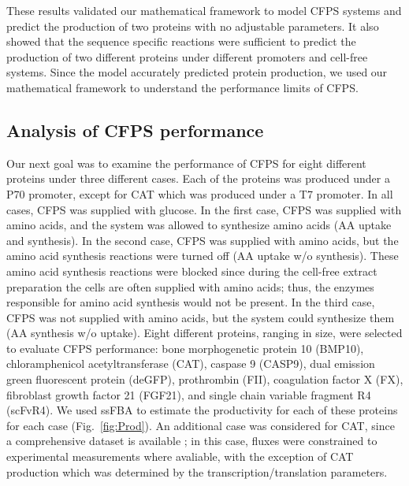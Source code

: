 \documentclass[journal=asbcd6,manuscript=article]{achemso}
\begin{document}
These results validated our mathematical framework to model CFPS systems and predict the production of two proteins with no adjustable parameters.
It also showed that the sequence specific reactions were sufficient to predict the production of two different proteins under different promoters and cell-free systems.
Since the model accurately predicted protein production, we used our mathematical framework to understand the performance limits of CFPS.

\subsection{Analysis of CFPS performance}
Our next goal was to examine the performance of CFPS for eight different proteins under three different cases.
Each of the proteins was produced under a P70 promoter, except for CAT which was produced under a T7 promoter.
In all cases, CFPS was supplied with glucose.
In the first case, CFPS was supplied with amino acids, and the system was allowed to synthesize amino acids (AA uptake and synthesis).
In the second case, CFPS was supplied with amino acids, but the amino acid synthesis reactions were turned off (AA uptake w/o synthesis).
These amino acid synthesis reactions were blocked since during the cell-free extract preparation the cells are often supplied with amino acids; thus, the enzymes responsible for amino acid synthesis would not be present.
In the third case, CFPS was not supplied with amino acids, but the system could synthesize them (AA synthesis w/o uptake).
Eight different proteins, ranging in size, were selected to evaluate CFPS performance: bone morphogenetic protein 10 (BMP10), chloramphenicol acetyltransferase (CAT), caspase 9 (CASP9), dual emission green fluorescent protein (deGFP), prothrombin (FII), coagulation factor X (FX), fibroblast growth factor 21 (FGF21), and single chain variable fragment R4 (scFvR4).
We used ssFBA to estimate the productivity for each of these proteins for each case (Fig.~\ref{fig:Prod}).
An additional case was considered for CAT, since a comprehensive dataset is available \cite{2005_calhoun_BiotechnologyProgress}; in this case, fluxes were constrained to experimental measurements where avaliable, with the exception of CAT production which was determined by the transcription/translation parameters.
\end{document}
